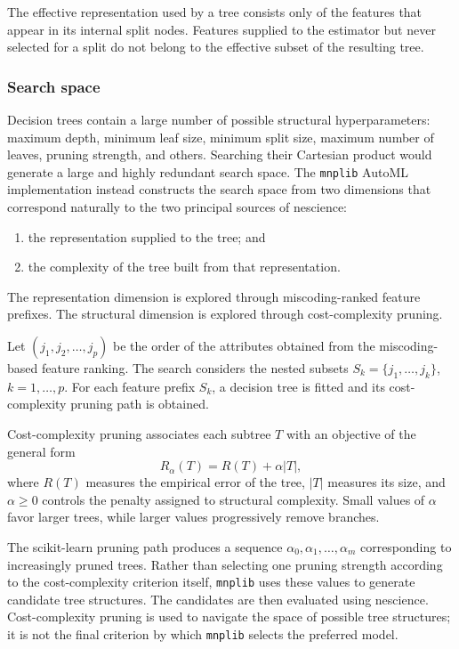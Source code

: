 The effective representation used by a tree consists only of the features that appear in its internal split nodes. Features supplied to the estimator but never selected for a split do not belong to the effective subset of the resulting tree.

\subsubsection{Search space}

Decision trees contain a large number of possible structural hyperparameters: maximum depth, minimum leaf size, minimum split size, maximum number of leaves, pruning strength, and others. Searching their Cartesian product would generate a large and highly redundant search space. The \texttt{mnplib} AutoML implementation instead constructs the search space from two dimensions that correspond naturally to the two principal sources of nescience:

\begin{enumerate}
    \item the representation supplied to the tree; and
    \item the complexity of the tree built from that representation.
\end{enumerate}

The representation dimension is explored through miscoding-ranked feature prefixes. The structural dimension is explored through cost-complexity pruning.

Let $(j_1,j_2,\ldots,j_p)$ be the order of the attributes obtained from the miscoding-based feature ranking. The search considers the nested subsets $S_k = \{j_1,\ldots,j_k\}$, $k=1, \ldots, p$. For each feature prefix $S_k$, a decision tree is fitted and its cost-complexity pruning path is obtained.

Cost-complexity pruning associates each subtree \(T\) with an objective of the general form
\[
R_\alpha(T) = R(T) + \alpha |T|,
\]
where $R(T)$ measures the empirical error of the tree, $|T|$ measures its size, and $\alpha \geq 0$ controls the penalty assigned to structural complexity. Small values of $\alpha$ favor larger trees, while larger values progressively remove branches.

The scikit-learn pruning path produces a sequence $\alpha_0, \alpha_1, \ldots, \alpha_m$ corresponding to increasingly pruned trees. Rather than selecting one pruning strength according to the cost-complexity
criterion itself, \texttt{mnplib} uses these values to generate candidate tree structures. The candidates are then evaluated using nescience. Cost-complexity pruning is used to navigate the space of possible tree structures; it is not the final criterion by which \texttt{mnplib} selects the preferred model.

